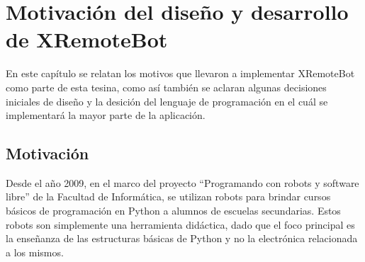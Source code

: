 \chapter{Motivación del diseño y desarrollo de XRemoteBot}\label{cha:motivacion}

En este capítulo se relatan los motivos que llevaron a implementar XRemoteBot
como
parte de esta tesina, como así también se aclaran algunas decisiones
iniciales de
diseño y la desición del lenguaje de programación en el cuál se implementará
la mayor
parte de la aplicación.


\section{Motivación}\label{sec:motivacion}
Desde el año 2009, en el marco del proyecto ``Programando con robots y
software libre'' de la Facultad de Informática,
se utilizan robots para brindar cursos básicos de programación en Python a alumnos de escuelas
secundarias. Estos robots son simplemente una herramienta didáctica, dado que el foco principal es la enseñanza de las estructuras básicas de Python y no la electrónica relacionada a los mismos.



